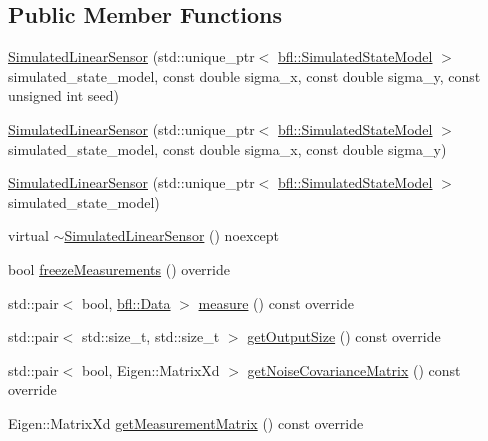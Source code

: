 \subsection*{Public Member Functions}
\begin{DoxyCompactItemize}
\item 
\mbox{\hyperlink{classbfl_1_1SimulatedLinearSensor_a8635098b474ee1a6601a857a3700728a}{Simulated\+Linear\+Sensor}} (std\+::unique\+\_\+ptr$<$ \mbox{\hyperlink{classbfl_1_1SimulatedStateModel}{bfl\+::\+Simulated\+State\+Model}} $>$ simulated\+\_\+state\+\_\+model, const double sigma\+\_\+x, const double sigma\+\_\+y, const unsigned int seed)
\item 
\mbox{\hyperlink{classbfl_1_1SimulatedLinearSensor_ace695adab328d6472d1d314b1b9fa81a}{Simulated\+Linear\+Sensor}} (std\+::unique\+\_\+ptr$<$ \mbox{\hyperlink{classbfl_1_1SimulatedStateModel}{bfl\+::\+Simulated\+State\+Model}} $>$ simulated\+\_\+state\+\_\+model, const double sigma\+\_\+x, const double sigma\+\_\+y)
\item 
\mbox{\hyperlink{classbfl_1_1SimulatedLinearSensor_aa347b51d54d290d1a3add38736f5b262}{Simulated\+Linear\+Sensor}} (std\+::unique\+\_\+ptr$<$ \mbox{\hyperlink{classbfl_1_1SimulatedStateModel}{bfl\+::\+Simulated\+State\+Model}} $>$ simulated\+\_\+state\+\_\+model)
\item 
virtual \mbox{\hyperlink{classbfl_1_1SimulatedLinearSensor_a3bb14237890741300a25aa63e12f9855}{$\sim$\+Simulated\+Linear\+Sensor}} () noexcept
\item 
bool \mbox{\hyperlink{classbfl_1_1SimulatedLinearSensor_a683f147d792a79c5ad4c6746210dfdee}{freeze\+Measurements}} () override
\item 
std\+::pair$<$ bool, \mbox{\hyperlink{namespacebfl_af6b103c6821db1b54452f776fdd9dd02}{bfl\+::\+Data}} $>$ \mbox{\hyperlink{classbfl_1_1SimulatedLinearSensor_a61c278bdbc5f3a0201d2f855a739d4f4}{measure}} () const override
\item 
std\+::pair$<$ std\+::size\+\_\+t, std\+::size\+\_\+t $>$ \mbox{\hyperlink{classbfl_1_1SimulatedLinearSensor_a00e869da2b16b5ead1d76a7b32e9fc4b}{get\+Output\+Size}} () const override
\item 
std\+::pair$<$ bool, Eigen\+::\+Matrix\+Xd $>$ \mbox{\hyperlink{classbfl_1_1LinearModel_a9adc7aabd58e79ce71c283866ddbf655}{get\+Noise\+Covariance\+Matrix}} () const override
\item 
Eigen\+::\+Matrix\+Xd \mbox{\hyperlink{classbfl_1_1LinearModel_a7dbfa7e8cbdc9ee863febf92e6046400}{get\+Measurement\+Matrix}} () const override
\item 

\end{DoxyCompactItemize}
